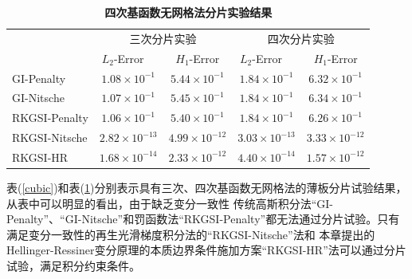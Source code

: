 \begin{table}[H]
    \caption{\textbf{四次基函数无网格法分片实验结果}}
    \centering\label{quartic}
   \begin{tabular}{lcccc}
   \toprule
   & \multicolumn{2}{c}{三次分片实验} & \multicolumn{2}{c}{四次分片实验} \\ \cline{2-5}
   &$L_2$-Error$\quad$&$H_1$-Error&$L_2$-Error$\quad$&$H_1$-Error\\
   \midrule
   GI-Penalty&$1.08\times10^{-1}$&$5.44\times10^{-1}$&$1.84\times10^{-1}$&$6.32\times10^{-1}$\\
   GI-Nitsche&$1.07\times10^{-1}$&$5.45\times10^{-1}$&$1.84\times10^{-1}$&$6.34\times10^{-1}$\\
  RKGSI-Penalty&$1.06\times10^{-1}$&$5.40\times10^{-1}$&$1.84\times10^{-1}$&$6.26\times10^{-1}$\\
  RKGSI-Nitsche&$2.82\times10^{-13}$&$4.99\times10^{-12}$&$3.03\times10^{-13}$&$3.33\times10^{-12}$\\
  RKGSI-HR&$1.68\times10^{-14}$&$2.33\times10^{-12}$&$4.40\times10^{-14}$&$1.57\times10^{-12}$\\
\bottomrule
\end{tabular}
\end{table}\par
表(\ref{cubic})和表(\ref{quartic})分别表示具有三次、四次基函数无网格法的薄板分片试验结果，从表中可以明显的看出，由于缺乏变分一致性
传统高斯积分法“GI-Penalty”、“GI-Nitsche”和罚函数法“RKGSI-Penalty”都无法通过分片试验。只有满足变分一致性的再生光滑梯度积分法的“RKGSI-Nitsche”法和
本章提出的Hellinger-Ressiner变分原理的本质边界条件施加方案“RKGSI-HR”法可以通过分片试验，满足积分约束条件。
